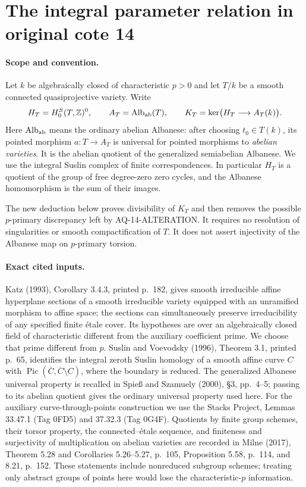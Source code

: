 \documentclass[11pt,a4paper]{article}
\theoremstyle{definition}\newtheorem{definition}[theorem]{Definition}
\theoremstyle{remark}\newtheorem{remark}[theorem]{Remark}
\begin{document}

\section{The integral parameter relation in original cote 14}
\label{sec:cc-integral-albanese}

\paragraph{Scope and convention.}
Let $k$ be algebraically closed of characteristic $p>0$ and
let $T/k$ be a smooth connected quasiprojective variety.
Write
\[
 H_T=H^S_0(T,\mathbb Z)^0,\qquad
 A_T=\operatorname{Alb}_{\rm ab}(T),\qquad
 K_T=\ker\bigl(H_T\longrightarrow A_T(k)\bigr).
\]
Here $\operatorname{Alb}_{\rm ab}$ means the ordinary abelian
Albanese: after choosing $t_0\in T(k)$, its pointed morphism
$a:T\to A_T$ is universal for pointed morphisms to
\emph{abelian varieties}.  It is the abelian quotient of the
generalized semiabelian Albanese.  We use the integral Suslin
complex of finite correspondences.  In particular $H_T$ is a
quotient of the group of free degree-zero zero cycles, and
the Albanese homomorphism is the sum of their images.

The new deduction below proves divisibility of $K_T$ and
then removes the possible $p$-primary discrepancy left by
AQ-14-ALTERATION.  It requires no resolution of singularities
or smooth compactification of $T$.  It does not assert
injectivity of the Albanese map on $p$-primary torsion.

\paragraph{Exact cited inputs.}
Katz (1993), Corollary 3.4.3, printed p.~182, gives smooth
irreducible affine hyperplane sections of a smooth
irreducible variety equipped with an unramified morphism to
affine space; the sections can simultaneously preserve
irreducibility of any specified finite \'{e}tale cover.
Its hypotheses are over an algebraically closed field of
characteristic different from the auxiliary coefficient
prime.  We choose that prime different from $p$.
Suslin and Voevodsky (1996), Theorem 3.1, printed p.~65,
identifies the integral zeroth Suslin homology of a smooth
affine curve $C$ with
$\operatorname{Pic}(\overline C,\overline C\setminus C)$,
where the boundary is reduced.
The generalized Albanese universal property is recalled
in Spie{\ss} and Szamuely (2000), \S3, pp.~4--5;
passing to its abelian quotient gives the ordinary
universal property used here.
For the auxiliary curve-through-points construction we
use the Stacks Project, Lemmas 33.47.1 (Tag 0FD5) and
37.32.3 (Tag 0G4F).
Quotients by finite group schemes, their torsor property,
the connected--\'{e}tale sequence, and finiteness and
surjectivity of multiplication on abelian varieties are
recorded in Milne (2017), Theorem 5.28 and Corollaries
5.26--5.27, p.~105, Proposition 5.58, p.~114, and 8.21,
p.~152.  These statements include nonreduced subgroup
schemes; treating only abstract groups of points here
would lose the characteristic-$p$ information.
\end{document}
